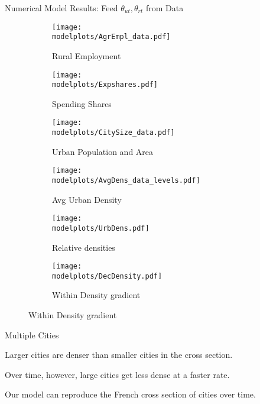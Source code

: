 \documentclass[aspectratio=169]{beamer}
\begin{document}
\begin{frame}{Numerical Model Results: Feed $\theta_{ut},\theta_{rt}$ from Data}
	\begin{figure}
		\begin{subfigure}[t]{0.32\textwidth}
			\centering
			\texttt{[image: \\modelplots/AgrEmpl\_data.pdf]}
			\caption{Rural Employment}
			\label{fig:sub1}
		\end{subfigure}\hskip 1mm%
		\begin{subfigure}[t]{0.32\textwidth}
			\centering
			\texttt{[image: \\modelplots/Expshares.pdf]}
			\label{fig:sub2}
			\caption{Spending Shares}
		\end{subfigure}
		\begin{subfigure}[t]{0.32\textwidth}
			\centering
			\texttt{[image: \\modelplots/CitySize\_data.pdf]}
			\label{fig:sub2}
			\caption{Urban Population and Area}
		\end{subfigure}

		\begin{subfigure}[t]{0.32\textwidth}
			\centering
			\texttt{[image: \\modelplots/AvgDens\_data\_levels.pdf]}
			\caption{Avg Urban Density}
			\label{fig:sub1}
		\end{subfigure}\hskip 1mm%
		\begin{subfigure}[t]{0.32\textwidth}
			\centering
			\texttt{[image: \\modelplots/UrbDens.pdf]}
			\label{fig:sub2}
			\caption{Relative densities}
		\end{subfigure}
		\begin{subfigure}[t]{0.32\textwidth}
			\centering
			\texttt{[image: \\modelplots/DecDensity.pdf]}
			\label{fig:sub2}
			\caption{Within Density gradient}
		\end{subfigure}
	\end{figure}
\end{frame}

\begin{frame}{Multiple Cities}

\begin{midi}
\item Larger cities are denser than smaller cities in the cross section.
\item Over time, however, large cities get less dense at a faster rate.
\item Our model can reproduce the French cross section of cities over time.

\end{midi}
\end{frame}
\end{document}
